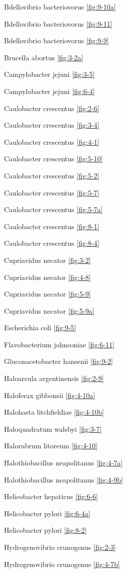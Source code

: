 \documentclass[]{tufte-book}
\begin{document}
Bdellovibrio bacteriovorus \ref{fig:9-10a}

Bdellovibrio bacteriovorus \ref{fig:9-11}

Bdellovibrio bacteriovorus \ref{fig:9-9}

Brucella abortus \ref{fig:3-2a}

Campylobacter jejuni \ref{fig:3-5}

Campylobacter jejuni \ref{fig:6-4}

Caulobacter crescentus \ref{fig:2-6}

Caulobacter crescentus \ref{fig:3-4}

Caulobacter crescentus \ref{fig:4-1}

Caulobacter crescentus \ref{fig:5-10}

Caulobacter crescentus \ref{fig:5-2}

Caulobacter crescentus \ref{fig:5-7}

Caulobacter crescentus \ref{fig:5-7a}

Caulobacter crescentus \ref{fig:8-1}

Caulobacter crescentus \ref{fig:8-4}

Cupriavidus necator \ref{fig:3-2}

Cupriavidus necator \ref{fig:4-8}

Cupriavidus necator \ref{fig:5-9}

Cupriavidus necator \ref{fig:5-9a}

Escherichia coli \ref{fig:9-5}

Flavobacterium johnsoniae \ref{fig:6-11}

Gluconacetobacter hansenii \ref{fig:9-2}

Haloarcula argentinensis \ref{fig:2-9}

Haloferax gibbonsii \ref{fig:4-10a}

Halohasta litchfieldiae \ref{fig:4-10b}

Haloquadratum walsbyi \ref{fig:3-7}

Halorubrum litoreum \ref{fig:4-10}

Halothiobacillus neapolitanus \ref{fig:4-7a}

Halothiobacillus neapolitanus \ref{fig:4-9b}

Helicobacter hepaticus \ref{fig:6-6}

Helicobacter pylori \ref{fig:6-4a}

Helicobacter pylori \ref{fig:8-2}

Hydrogenovibrio crunogenus \ref{fig:2-3}

Hydrogenovibrio crunogenus \ref{fig:4-7b}
\end{document}
